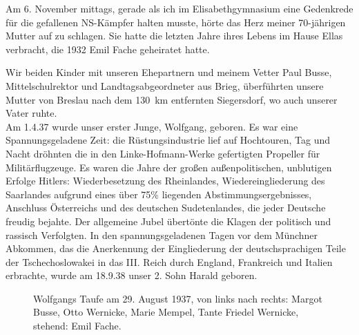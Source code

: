 \documentclass[a5paper,pagesize,10pt,twoside=true]{scrbook}
\begin{document}
Am 6. November mittags, gerade als ich im Elisabethgymnasium eine Gedenkrede für die gefallenen NS-Kämpfer halten musste, hörte das Herz meiner 70-jährigen Mutter auf zu schlagen. Sie hatte die letzten Jahre ihres Lebens im Hause Ellas verbracht, die 1932 Emil Fache geheiratet hatte.

Wir beiden Kinder mit unseren Ehepartnern und meinem Vetter Paul Busse, Mittelschulrektor und Landtagsabgeordneter aus Brieg, überführten unsere Mutter von Breslau nach dem 130~km entfernten Siegersdorf, wo auch unserer Vater ruhte.\\

Am 1.4.37 wurde unser erster Junge, Wolfgang, geboren. Es war eine Spannungsgeladene Zeit: die Rüstungsindustrie lief auf Hochtouren, Tag und Nacht dröhnten die in den Linke-Hofmann-Werke gefertigten Propeller für Militärflugzeuge. Es waren die Jahre der großen außenpolitischen, unblutigen Erfolge Hitlers: Wiederbesetzung des Rheinlandes, Wiedereingliederung des Saarlandes aufgrund eines über 75\% liegenden Abstimmungsergebnisses, Anschluss Österreichs und des deutschen Sudetenlandes, die jeder Deutsche freudig bejahte. Der allgemeine Jubel übertönte die Klagen der politisch und rassisch Verfolgten. In den spannungsgeladenen Tagen vor dem Münchner Abkommen, das die Anerkennung der Eingliederung der deutschsprachigen Teile der Tschechoslowakei in das III. Reich durch England, Frankreich und Italien erbrachte, wurde am 18.9.38 unser 2. Sohn Harald geboren.

\begin{figure}[h]
	\caption[Wolfgangs Taufe]{Wolfgangs Taufe am 29. August 1937, von links nach rechts: Margot Busse, Otto Wernicke, Marie Mempel, Tante Friedel Wernicke, stehend: Emil Fache.\footnotemark}
	\label{fig:wolfgangs_taufe}
\end{figure}
\end{document}

